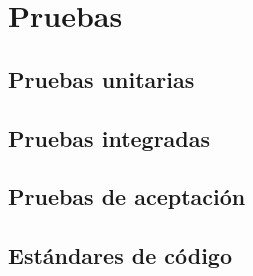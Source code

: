 
\chapter{Pruebas}\label{pruebas}
\section{Pruebas unitarias}\label{sec:pruebas_unitarias}

\section{Pruebas integradas}\label{sec:pruebas_integradas}

\section{Pruebas de aceptación}\label{sec:pruebas_aceptacion}

\section{Estándares de código}\label{sec:estandares_codigo}
